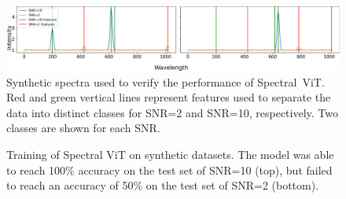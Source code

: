 \begin{frame}
    \begin{figure}[t]
        \centering
        \includegraphics[width=\textwidth]{figures/synth_data_new.png}
        \caption[Synthetic spectra]{Synthetic spectra used to verify the performance of Spectral~ViT. Red and green vertical lines represent features used to 
        separate the data into distinct classes for SNR=2 and SNR=10, respectively. Two classes are shown for each SNR.}
        \label{fig:synth_spectra}
    \end{figure}
\end{frame}


\begin{frame}
    \begin{figure}[t]
        \centering
        \qquad
        \caption[Verification of ViT: Synthetic Dataset]{Training of Spectral ViT on synthetic datasets. The model was able to reach 100\% accuracy on the test set of SNR=10 (top), 
        but failed to reach an accuracy of 50\% on the test set of SNR=2 (bottom).}
    \label{fig:synth_spectra_training}
    \end{figure}
\end{frame}

